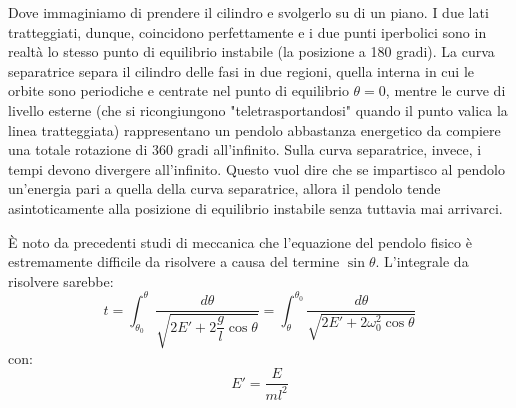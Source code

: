 \documentclass[a4paper,openany]{article}
\begin{document}
	\begin{figure}[H]
		\centering
	\end{figure}
	Dove immaginiamo di prendere il cilindro e svolgerlo su di un piano. I due lati tratteggiati, dunque, coincidono perfettamente e i due punti iperbolici sono in realtà lo stesso punto di equilibrio instabile (la posizione a 180 gradi). La curva separatrice separa il cilindro delle fasi in due regioni, quella interna in cui le orbite sono periodiche e centrate nel punto di equilibrio $\theta = 0$, mentre le curve di livello esterne (che si ricongiungono "teletrasportandosi" quando il punto valica la linea tratteggiata) rappresentano un pendolo abbastanza energetico da compiere una totale rotazione di 360 gradi all'infinito. Sulla curva separatrice, invece, i tempi devono divergere all'infinito. Questo vuol dire che se impartisco al pendolo un'energia pari a quella della curva separatrice, allora il pendolo tende asintoticamente alla posizione di equilibrio instabile senza tuttavia mai arrivarci.
	
	È noto da precedenti studi di meccanica che l'equazione del pendolo fisico è estremamente difficile da risolvere a causa del termine $\sin\theta$. L'integrale da risolvere sarebbe:
	\begin{equation}
		t = \int_{\theta_0}^{\theta}\dfrac{d\theta}{\sqrt{2E'+2\dfrac{g}{l}\cos\theta}} =  \int_{\theta}^{\theta_0}\dfrac{d\theta}{\sqrt{2E'+2\omega_0^2\cos\theta}}
		\label{Pendolo}
	\end{equation}
	con:
	$$
	E' = \dfrac{E}{ml^2}
	$$
	
\end{document}
